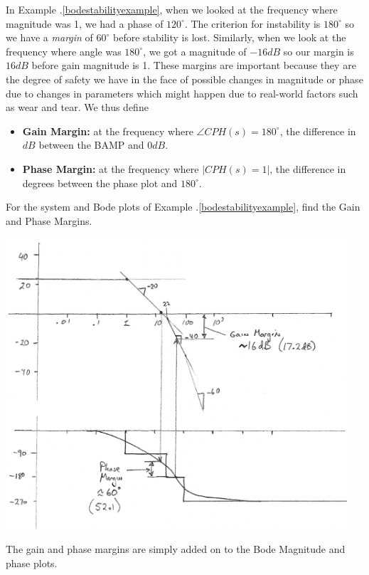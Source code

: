 In Example \thechapter.\ref{bodestabilityexample}, when we looked at the frequency where magnitude was 1, we had a phase of $120^\circ$.  The criterion for instability is $180^\circ$ so we have a {\it margin} of $60^\circ$ before stability is lost.  Similarly, when we look at the frequency where angle was $180^\circ$, we got a magnitude of $-16dB$ so our margin is $16dB$ before gain magnitude is 1.   These margins are important because they are the degree of safety we have in the face of possible changes in magnitude or phase due to changes in parameters which might happen due to real-world factors such as wear and tear.   We thus define

\begin{itemize}
  \item {\bf Gain  Margin:} at the frequency where $\angle CPH(s) = 180^\circ$, the difference in $dB$ between the BAMP and 0$dB$.
  \item {\bf Phase Margin:} at the frequency where $\left |CPH(s) = 1\right |$, the difference in degrees  between the phase plot and $180^\circ$.
\end{itemize}


\begin{ExampleSmall}
For the system and Bode plots of Example \thechapter.\ref{bodestabilityexample}, find the Gain and Phase Margins.

\includegraphics[width=5.0in]{figs06/00794a.png}

The gain and phase margins are simply added on to the Bode Magnitude and phase plots.

\end{ExampleSmall}

